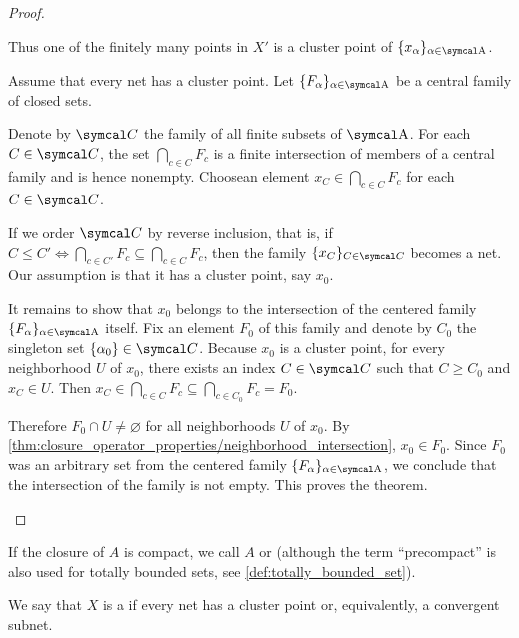 \begin{proof}
\begin{description}
    Thus one of the finitely many points in \( X' \) is a cluster point of \( \{ x_\al \}_{\al \in \CA} \).

    \cite[theorem 3.1.23]{Engelking1989} Assume that every net has a cluster point. Let \( \{ F_\al \}_{\al \in \CA} \) be a central family of closed sets.

    Denote by \( \Cal C \) the family of all finite subsets of \( \CA \). For each \( C \in \Cal C \), the set \( \bigcap_{c \in C} F_c \) is a finite intersection of members of a central family and is hence nonempty. Choose\AOC an element \( x_C \in \bigcap_{c \in C} F_c \) for each \( C \in \Cal C \).

    If we order \( \Cal C \) by reverse inclusion, that is, if \( C \leq C' \iff \bigcap_{c \in C'} F_c \subseteq \bigcap_{c \in C} F_c \), then the family \( \{ x_C \}_{C \in \Cal C} \) becomes a net. Our assumption is that it has a cluster point, say \( x_0 \).

    It remains to show that \( x_0 \) belongs to the intersection of the centered family \( \{ F_\al \}_{\al \in \CA} \) itself. Fix an element \( F_0 \) of this family and denote by \( C_0 \) the singleton set \( \{ \al_0 \} \in \Cal C \). Because \( x_0 \) is a cluster point, for every neighborhood \( U \) of \( x_0 \), there exists an index \( C \in \Cal C \) such that \( C \geq C_0 \) and \( x_C \in U \). Then \( x_C \in \bigcap_{c \in C} F_c \subseteq \bigcap_{c \in C_0} F_c = F_0 \).

    Therefore \( F_0 \cap U \neq \varnothing \) for all neighborhoods \( U \) of \( x_0 \). By \cref{thm:closure_operator_properties/neighborhood_intersection}, \( x_0 \in F_0 \). Since \( F_0 \) was an arbitrary set from the centered family \( \{ F_\al \}_{\al \in \CA} \), we conclude that the intersection of the family is not empty. This proves the theorem.
  \end{description}
\end{proof}

\begin{remark}\label{remark:precompact_set}
  If the closure of \( A \) is compact, we call \( A \)  or  (although the term \enquote{precompact} is also used for totally bounded sets, see \ref{def:totally_bounded_set}).
\end{remark}

\begin{definition}\label{def:sequentially_compact_space}
  We say that \( X \) is a  if every net has a cluster point or, equivalently, a convergent subnet.
\end{definition}

